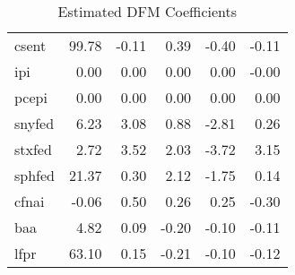 \documentclass[11pt, letterpaper]{article}\usepackage[]{graphicx}\usepackage[]{color}
\begin{document}
\begin{table}[H]
\begin{tabular}{lrrrrr}
  csent & 99.78 & -0.11 & 0.39 & -0.40 & -0.11 \\ 
  ipi & 0.00 & 0.00 & 0.00 & 0.00 & -0.00 \\ 
  pcepi & 0.00 & 0.00 & 0.00 & 0.00 & 0.00 \\ 
  snyfed & 6.23 & 3.08 & 0.88 & -2.81 & 0.26 \\ 
  stxfed & 2.72 & 3.52 & 2.03 & -3.72 & 3.15 \\ 
  sphfed & 21.37 & 0.30 & 2.12 & -1.75 & 0.14 \\ 
  cfnai & -0.06 & 0.50 & 0.26 & 0.25 & -0.30 \\ 
  baa & 4.82 & 0.09 & -0.20 & -0.10 & -0.11 \\ 
  lfpr & 63.10 & 0.15 & -0.21 & -0.10 & -0.12 \\ 
   \hline
\end{tabular}
\endgroup
\caption{Estimated DFM Coefficients} 
\end{table}
\end{document}
